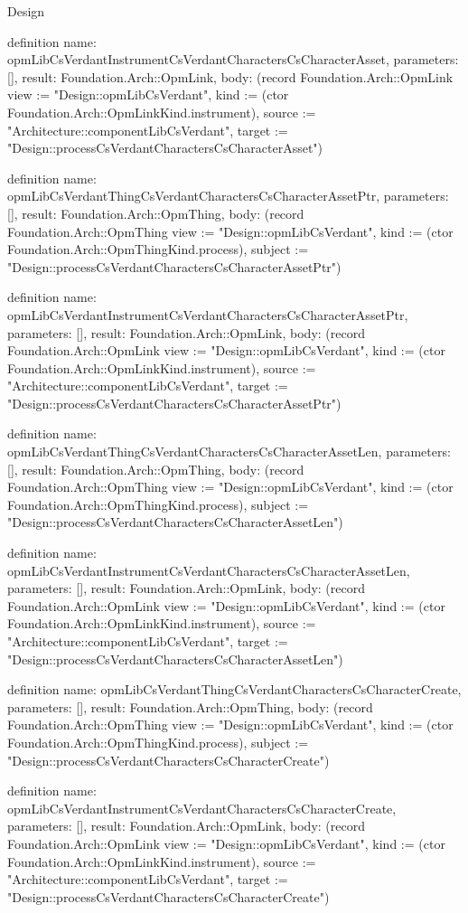 \begin{lexlean}{Design}
\begin{semanticmodule}
definition{
  name: opmLibCsVerdantInstrumentCsVerdantCharactersCsCharacterAsset,
  parameters: [],
  result: Foundation.Arch::OpmLink,
  body: (record Foundation.Arch::OpmLink {view := "Design::opmLibCsVerdant", kind := (ctor Foundation.Arch::OpmLinkKind.instrument), source := "Architecture::componentLibCsVerdant", target := "Design::processCsVerdantCharactersCsCharacterAsset"})
}

definition{
  name: opmLibCsVerdantThingCsVerdantCharactersCsCharacterAssetPtr,
  parameters: [],
  result: Foundation.Arch::OpmThing,
  body: (record Foundation.Arch::OpmThing {view := "Design::opmLibCsVerdant", kind := (ctor Foundation.Arch::OpmThingKind.process), subject := "Design::processCsVerdantCharactersCsCharacterAssetPtr"})
}

definition{
  name: opmLibCsVerdantInstrumentCsVerdantCharactersCsCharacterAssetPtr,
  parameters: [],
  result: Foundation.Arch::OpmLink,
  body: (record Foundation.Arch::OpmLink {view := "Design::opmLibCsVerdant", kind := (ctor Foundation.Arch::OpmLinkKind.instrument), source := "Architecture::componentLibCsVerdant", target := "Design::processCsVerdantCharactersCsCharacterAssetPtr"})
}

definition{
  name: opmLibCsVerdantThingCsVerdantCharactersCsCharacterAssetLen,
  parameters: [],
  result: Foundation.Arch::OpmThing,
  body: (record Foundation.Arch::OpmThing {view := "Design::opmLibCsVerdant", kind := (ctor Foundation.Arch::OpmThingKind.process), subject := "Design::processCsVerdantCharactersCsCharacterAssetLen"})
}

definition{
  name: opmLibCsVerdantInstrumentCsVerdantCharactersCsCharacterAssetLen,
  parameters: [],
  result: Foundation.Arch::OpmLink,
  body: (record Foundation.Arch::OpmLink {view := "Design::opmLibCsVerdant", kind := (ctor Foundation.Arch::OpmLinkKind.instrument), source := "Architecture::componentLibCsVerdant", target := "Design::processCsVerdantCharactersCsCharacterAssetLen"})
}

definition{
  name: opmLibCsVerdantThingCsVerdantCharactersCsCharacterCreate,
  parameters: [],
  result: Foundation.Arch::OpmThing,
  body: (record Foundation.Arch::OpmThing {view := "Design::opmLibCsVerdant", kind := (ctor Foundation.Arch::OpmThingKind.process), subject := "Design::processCsVerdantCharactersCsCharacterCreate"})
}

definition{
  name: opmLibCsVerdantInstrumentCsVerdantCharactersCsCharacterCreate,
  parameters: [],
  result: Foundation.Arch::OpmLink,
  body: (record Foundation.Arch::OpmLink {view := "Design::opmLibCsVerdant", kind := (ctor Foundation.Arch::OpmLinkKind.instrument), source := "Architecture::componentLibCsVerdant", target := "Design::processCsVerdantCharactersCsCharacterCreate"})
}


\end{semanticmodule}
\end{lexlean}
